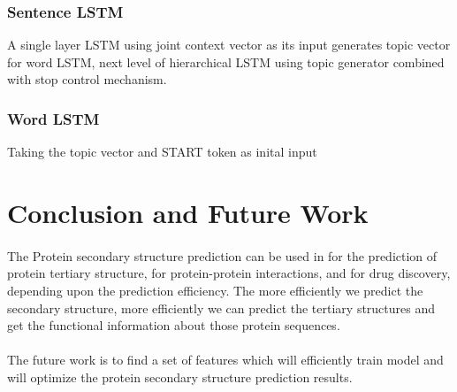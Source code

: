 \documentclass[12pt]{article}
\numberwithin{figure}{section}
\begin{document}
\paragraph{}
\subsubsection{Sentence LSTM}
A single layer LSTM using joint context vector as its input generates topic vector for word LSTM, next level of hierarchical LSTM using topic generator combined with stop control mechanism.
\paragraph{}
\subsubsection{Word LSTM}
Taking the topic vector and START token as inital input 
\paragraph{}

\section{Conclusion and Future Work}
\paragraph{}
The Protein secondary structure prediction can be used in for the prediction of protein tertiary structure, for protein-protein interactions, and for drug discovery, depending upon the prediction efficiency. The more efficiently we predict the secondary structure, more efficiently we can predict the tertiary structures and get the functional information about those protein sequences. 
\paragraph{}
The future work is to find a set of features which will efficiently train model and will optimize the protein secondary structure prediction results.
\clearpage
\end{document}
